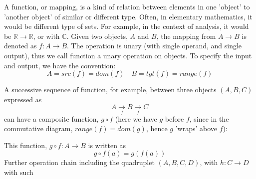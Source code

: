 A function, or mapping, is a kind of relation between elements in one 'object' to 'another object' of similar or different type. Often, in elementary mathematics, it would be different type of sets. For example, in the context of analysis, it would be $\mathbb{R}\longrightarrow \mathbb{R}$, or with $\mathbb{C}$. Given two objects, $A$ and $B$, the mapping from $A\longrightarrow B$ is denoted as $f: A\longrightarrow B$. The operation is unary (with single operand, and single output), thus we call function a unary operation on objects. To specify the input and output, we have the convention: 
\begin{equation*}
    A = src(f) = dom(f) \quad B = tgt(f) = range(f)
\end{equation*}

A successive sequence of function, for example, between three objects $(A,B,C)$ expressed as 
\begin{equation*}
    A \underset{f}{\longrightarrow} B \underset{f}{\longrightarrow} C 
\end{equation*}
can have a composite function, $g \circ f$ (here we have $g$ before $f$, since in the commutative diagram, $range(f)=dom(g)$, hence $g$ 'wraps' above $f$):

\begin{center}
\end{center}

This function, $g \circ f: A \longrightarrow B$ is written as
\begin{equation*}
    g \circ f (a) = g(f(a))
\end{equation*}
Further operation chain including the quadruplet $(A,B,C,D)$, with $h:C \longrightarrow D$ with such 
\begin{center}
    {
    }
\end{center}

